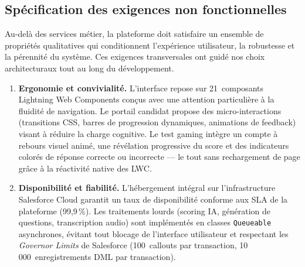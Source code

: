 \subsection{Spécification des exigences non fonctionnelles}

Au-delà des services métier, la plateforme doit satisfaire un ensemble de propriétés qualitatives qui conditionnent l'expérience utilisateur, la robustesse et la pérennité du système. Ces exigences transversales ont guidé nos choix architecturaux tout au long du développement.

\begin{enumerate}[label=\textbf{ENF-\arabic*}]

    \item \textbf{Ergonomie et convivialité.} L'interface repose sur 21~composants Lightning Web Components conçus avec une attention particulière à la fluidité de navigation. Le portail candidat propose des micro-interactions (transitions CSS, barres de progression dynamiques, animations de feedback) visant à réduire la charge cognitive. Le test gaming intègre un compte à rebours visuel animé, une révélation progressive du score et des indicateurs colorés de réponse correcte ou incorrecte --- le tout sans rechargement de page grâce à la réactivité native des LWC.

    \item \textbf{Disponibilité et fiabilité.} L'hébergement intégral sur l'infrastructure Salesforce Cloud garantit un taux de disponibilité conforme aux SLA de la plateforme (99,9\,\%). Les traitements lourds (scoring IA, génération de questions, transcription audio) sont implémentés en classes \texttt{Queueable} asynchrones, évitant tout blocage de l'interface utilisateur et respectant les \textit{Governor Limits} de Salesforce (100~callouts par transaction, 10\,000~enregistrements DML par transaction).


\end{enumerate}
